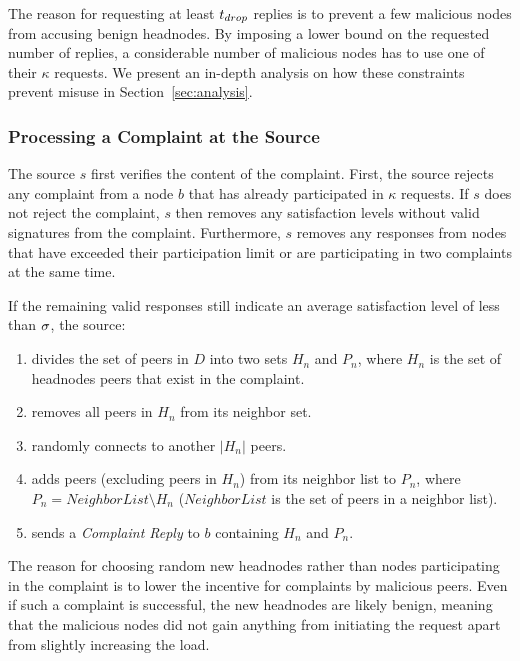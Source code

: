The reason for requesting at least $t_{drop}$ replies is to prevent a few malicious nodes from accusing benign headnodes. By imposing a lower bound on the requested number of replies, a considerable number of malicious nodes has to use one of their $\kappa$ requests. We present an in-depth analysis on how these constraints prevent misuse in Section~\ref{sec:analysis}. 

\subsubsection*{Processing a Complaint at the Source}

The source $s$ first verifies the content of the complaint. First, the source rejects any complaint from a node $b$ that has already participated in $\kappa$ requests. 
If $s$ does not reject the complaint, $s$ then removes any satisfaction levels without valid signatures from the complaint.
Furthermore, $s$ removes any responses from nodes that have exceeded their participation limit or are participating in two complaints at the same time. 

If the remaining valid responses still indicate an average satisfaction level of less than $\sigma$, the source:  
\begin{enumerate}
 \item divides the set of peers in $D$ into two sets $H_n$ and $P_n$, where $H_n$ is the set of headnodes peers that exist in the complaint. 
 \item removes all peers in $H_n$ from its neighbor set.
 \item randomly connects to another $|H_n|$ peers. 
 \item adds peers (excluding peers in $H_n$) from its neighbor list to $P_n$, where $P_n = NeighborList\setminus H_n$ ($NeighborList$ is the set of peers in a neighbor list). 
 \item sends a \textit{Complaint Reply} to $b$ containing $H_n$ and $P_n$.
\end{enumerate}
 The reason for choosing random new headnodes rather than nodes participating in the complaint is to lower the incentive for complaints by malicious peers.
 Even if such a complaint is successful, the new headnodes are likely benign, meaning that the malicious nodes did not gain anything from initiating the request apart from slightly increasing the load. 


